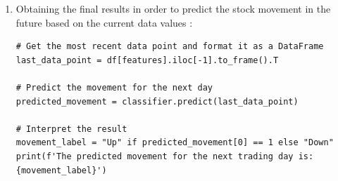 \documentclass[12pt,a4paper]{report}
\begin{document}
\begin{enumerate}
\begin{verbatim}
# Confusion matrix
cm = confusion_matrix(y_test, y_pred)
print("Confusion Matrix:\n", cm)

# Accuracy, Precision, Recall, F1-score
accuracy = accuracy_score(y_test, y_pred)
precision = precision_score(y_test, y_pred)
recall = recall_score(y_test, y_pred)
f1 = f1_score(y_test, y_pred)

print(f'Accuracy: {accuracy:.2f}')
print(f'Precision: {precision:.2f}')
print(f'Recall: {recall:.2f}')
print(f'F1-Score: {f1:.2f}')

# Detailed classification report
print("\nClassification Report:\n", classification_report(y_test, y_pred))

    \end{verbatim}
    \newpage
    \item Obtaining the final results in order to predict the stock movement in the future based on the current data values :
    \begin{verbatim}
# Get the most recent data point and format it as a DataFrame
last_data_point = df[features].iloc[-1].to_frame().T

# Predict the movement for the next day
predicted_movement = classifier.predict(last_data_point)

# Interpret the result
movement_label = "Up" if predicted_movement[0] == 1 else "Down"
print(f'The predicted movement for the next trading day is:
{movement_label}')

    \end{verbatim}
\end{enumerate}
\end{document}
